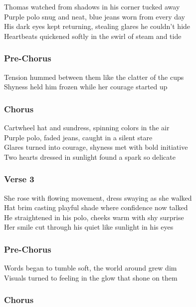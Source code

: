 \documentclass[]{article}
\begin{document}
Thomas watched from shadows in his corner tucked away\\
Purple polo snug and neat, blue jeans worn from every day\\
His dark eyes kept returning, stealing glares he couldn't hide\\
Heartbeats quickened softly in the swirl of steam and tide

\subsubsection{Pre-Chorus}\label{pre-chorus-47}

Tension hummed between them like the clatter of the cups\\
Shyness held him frozen while her courage started up

\subsubsection{Chorus}\label{chorus-78}

Cartwheel hat and sundress, spinning colors in the air\\
Purple polo, faded jeans, caught in a silent stare\\
Glares turned into courage, shyness met with bold initiative\\
Two hearts dressed in sunlight found a spark so delicate

\subsubsection{Verse 3}\label{verse-3-13}

She rose with flowing movement, dress swaying as she walked\\
Hat brim casting playful shade where confidence now talked\\
He straightened in his polo, cheeks warm with shy surprise\\
Her smile cut through his quiet like sunlight in his eyes

\subsubsection{Pre-Chorus}\label{pre-chorus-48}

Words began to tumble soft, the world around grew dim\\
Visuals turned to feeling in the glow that shone on them

\subsubsection{Chorus}\label{chorus-79}
\end{document}
